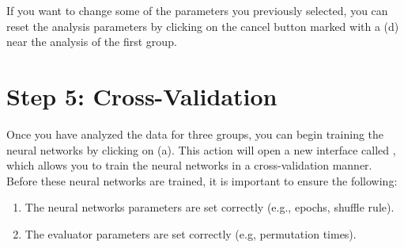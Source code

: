 \documentclass[justified]{tufte-handout}
\begin{document}
{If you want to change some of the parameters you previously selected, you can reset the analysis parameters by clicking on the cancel button marked with a  (d) near the analysis of the first group.
 
\clearpage
\section{Step 5: Cross-Validation}

Once you have analyzed the data for three groups, you can begin training the neural networks by clicking on  (a). 
This action will open a new interface called , which allows you to train the neural networks in a cross-validation manner.
Before these neural networks are trained, it is important to ensure the following: 
\begin{enumerate}
	\item The neural networks parameters are set correctly (e.g., epochs, shuffle rule).
	\item The evaluator parameters are set correctly (e.g, permutation times).
\end{enumerate}

}
\end{document}
